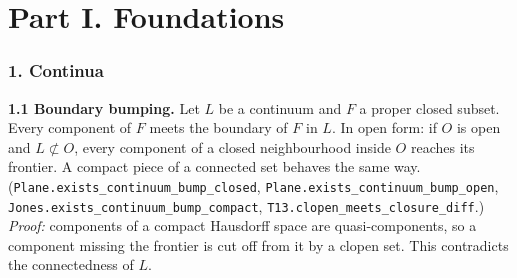 \documentclass[11pt]{article}
\newcommand{\lean}[1]{\texttt{#1}}
\begin{document}
\bigskip

\part*{Part I. Foundations}

\section*{1. Continua}

\textbf{1.1 Boundary bumping.} Let $L$ be a continuum and $F$ a proper closed subset. Every component of $F$ meets the boundary of $F$ in $L$. In open form: if $O$ is open and $L \not\subset O$, every component of a closed neighbourhood inside $O$ reaches its frontier. A compact piece of a connected set behaves the same way. (\lean{Plane.\hspace{0pt}exists\_\hspace{0pt}continuum\_\hspace{0pt}bump\_\hspace{0pt}closed}, \lean{Plane.\hspace{0pt}exists\_\hspace{0pt}continuum\_\hspace{0pt}bump\_\hspace{0pt}open}, \lean{Jones.\hspace{0pt}exists\_\hspace{0pt}continuum\_\hspace{0pt}bump\_\hspace{0pt}compact}, \lean{T13.\hspace{0pt}clopen\_\hspace{0pt}meets\_\hspace{0pt}closure\_\hspace{0pt}diff}.) \emph{Proof:} components of a compact Hausdorff space are quasi-components, so a component missing the frontier is cut off from it by a clopen set. This contradicts the connectedness of $L$.
\end{document}

